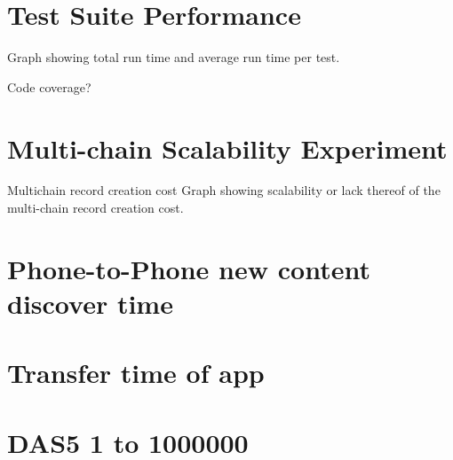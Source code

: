 \section{Test Suite Performance}
Graph showing total run time and average run time per test.

Code coverage?

\section{Multi-chain Scalability Experiment}
Multichain record creation cost
Graph showing scalability or lack thereof of the multi-chain record creation cost.


\section{Phone-to-Phone new content discover time}



\section{Transfer time of app}



\section{DAS5 1 to 1000000} 


